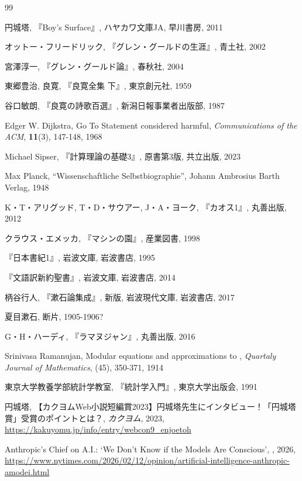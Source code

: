 \documentclass[10pt, a5paper, twoside]{ltjsarticle}
\begin{document}
	\begin{thebibliography}{99}

		 円城塔, 『Boy's Surface』, ハヤカワ文庫JA, 早川書房, 2011

         オットー・フリードリック, 『グレン・グールドの生涯』, 青土社, 2002

         宮澤淳一, 『グレン・グールド論』, 春秋社, 2004

         東郷豊治, 良寛, 『良寛全集 下』, 東京創元社, 1959

         谷口敏朗, 『良寛の詩歌百選』, 新潟日報事業者出版部, 1987

         Edger W. Dijkstra, Go To Statement considered harmful, \textit{Communications of the ACM}, \textbf{11}(3), 147-148, 1968

         Michael Sipser, 『計算理論の基礎3』, 原書第3版, 共立出版, 2023

         Max Planck, ``Wissenschaftliche Selbstbiographie'', Johann Ambrosius Barth Verlag, 1948

         K・T・アリグッド, T・D・サウアー, J・A・ヨーク, 『カオス1』, 丸善出版, 2012

         クラウス・エメッカ, 『マシンの園』, 産業図書, 1998

         『日本書紀1』, 岩波文庫, 岩波書店, 1995

         『文語訳新約聖書』, 岩波文庫, 岩波書店, 2014

         柄谷行人, 『漱石論集成』, 新版, 岩波現代文庫, 岩波書店, 2017

         夏目漱石, 断片, 1905-1906?

         G・H・ハーディ, 『ラマヌジャン』, 丸善出版, 2016

         Srinivasa Ramanujan, Modular equations and approximations to \pi, \textit{Quartaly Journal of Mathematics}, (45), 350-371, 1914

         東京大学教養学部統計学教室, 『統計学入門』, 東京大学出版会, 1991

         円城塔, 【カクヨムWeb小説短編賞2023】円城塔先生にインタビュー！「円城塔賞」受賞のポイントとは？, \textit{カクヨム}, 2023, \url{https://kakuyomu.jp/info/entry/webcon9_enjoetoh}

         Anthropic's Chief on A.I.: `We Don't Know if the Models Are Conscious', , 2026, \url{https://www.nytimes.com/2026/02/12/opinion/artificial-intelligence-anthropic-amodei.html}


\end{thebibliography}
\end{document}
